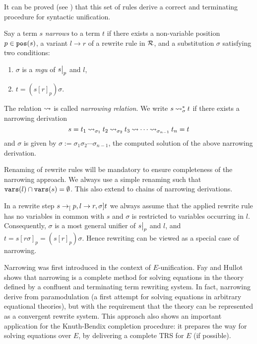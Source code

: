 It can be proved (see \cite{DBLP:books/el/RV01/BaaderS01}) that this set of rules derive a correct and terminating procedure for syntactic unification.

\begin{definition}\label{definition:narrow}
	Say a term $s$ \textit{narrows} to a term $t$ if there exists a non-variable position $p \in \mathtt{pos}(s)$, a variant $l \rightarrow r$ of a rewrite rule in $\mathcal{R}$, and a substitution $\sigma$ satisfying two conditions:
	\begin{enumerate}
		\item $\sigma$ is a \textit{mgu} of $\restr{s}{p}$ and $l$,
		\item $t = \left( s[r]_{p} \right)\sigma$.
	\end{enumerate}
\end{definition}

The relation $\mathbin{\rightsquigarrow}$ is called \textit{narrowing relation}. We write $s \mathbin{\rightsquigarrow}_{\sigma}^{*} t$ if there exists a narrowing derivation
$$s = t_1 \mathbin{\rightsquigarrow}_{\sigma_1} t_2 \mathbin{\rightsquigarrow}_{\sigma_2} t_3 \mathbin{\rightsquigarrow} \cdots \mathbin{\rightsquigarrow}_{\sigma_{n-1}}t_n = t$$
and $\sigma$ is given by $\sigma := \sigma_1\sigma_2 \cdots \sigma_{n-1}$, the computed solution of the above narrowing derivation.

\begin{remark}
	Renaming of rewrite rules will be mandatory to ensure completeness of the narrowing approach. We always use a simple renaming such that $\mathtt{vars}(l) \cap \mathtt{vars}(s) = \emptyset$. This also extend to chains of narrowing derivations.
\end{remark}

In a rewrite step $s \rightarrow_[p, l \rightarrow r, \sigma] t$ we always assume that the applied rewrite rule has no variables in common with $s$ and $\sigma$ is restricted to variables occurring in $l$. Consequently, $\sigma$ is a most general unifier of $\restr{s}{p}$ and $l$, and $t = s[r\sigma]_p = (s[r]_p)\sigma$. Hence rewriting can be viewed as a special case of narrowing.

Narrowing was first introduced in the context of $E$-unification. Fay \cite{fay1978first} and Hullot \cite{hullot:cfunif} shows that narrowing is a complete method for solving equations in the theory defined by a confluent and terminating term rewriting system. In fact, narrowing derive from paramodulation (a first attempt for solving equations in arbitrary equational theories), but with the requirement that the theory can be represented as a convergent rewrite system. This approach also shows an important application for the Knuth-Bendix completion procedure: it prepares the way for solving equations over $E$, by delivering a complete TRS for $E$ (if possible).

